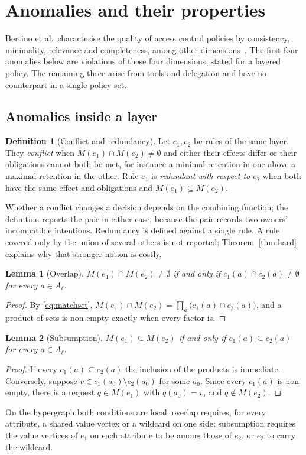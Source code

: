 \documentclass[preprint,12pt]{elsarticle}
\newtheorem{lemma}{Lemma}
\theoremstyle{definition}
\newtheorem{definition}{Definition}
\theoremstyle{remark}
\begin{document}
\section{Anomalies and their properties}\label{sec:theory}

Bertino et al.\ characterise the quality of access control policies by consistency, minimality, relevance and completeness, among other dimensions~\cite{bertino2018quality}. The first four anomalies below are violations of these four dimensions, stated for a layered policy. The remaining three arise from tools and delegation and have no counterpart in a single policy set.

\subsection{Anomalies inside a layer}\label{sec:pairwise}
\begin{definition}[Conflict and redundancy]\label{def:pair}
Let $e_1, e_2$ be rules of the same layer. They \emph{conflict} when $M(e_1) \cap M(e_2) \neq \emptyset$ and either their effects differ or their obligations cannot both be met, for instance a minimal retention in one above a maximal retention in the other. Rule $e_1$ is \emph{redundant with respect to} $e_2$ when both have the same effect and obligations and $M(e_1) \subseteq M(e_2)$.
\end{definition}
Whether a conflict changes a decision depends on the combining function; the definition reports the pair in either case, because the pair records two owners' incompatible intentions. Redundancy is defined against a single rule. A rule covered only by the union of several others is not reported; Theorem~\ref{thm:hard} explains why that stronger notion is costly.

\begin{lemma}[Overlap]\label{lem:overlap}
$M(e_1) \cap M(e_2) \neq \emptyset$ if and only if $c_1(a) \cap c_2(a) \neq \emptyset$ for every $a \in A_\ell$.
\end{lemma}
\begin{proof}
By \eqref{eq:matchset}, $M(e_1) \cap M(e_2) = \prod_a \bigl(c_1(a) \cap c_2(a)\bigr)$, and a product of sets is non-empty exactly when every factor is.
\end{proof}

\begin{lemma}[Subsumption]\label{lem:subsume}
$M(e_1) \subseteq M(e_2)$ if and only if $c_1(a) \subseteq c_2(a)$ for every $a \in A_\ell$.
\end{lemma}
\begin{proof}
If every $c_1(a) \subseteq c_2(a)$ the inclusion of the products is immediate. Conversely, suppose $v \in c_1(a_0) \setminus c_2(a_0)$ for some $a_0$. Since every $c_1(a)$ is non-empty, there is a request $q \in M(e_1)$ with $q(a_0) = v$, and $q \notin M(e_2)$.
\end{proof}
On the hypergraph both conditions are local: overlap requires, for every attribute, a shared value vertex or a wildcard on one side; subsumption requires the value vertices of $e_1$ on each attribute to be among those of $e_2$, or $e_2$ to carry the wildcard.
\end{document}
